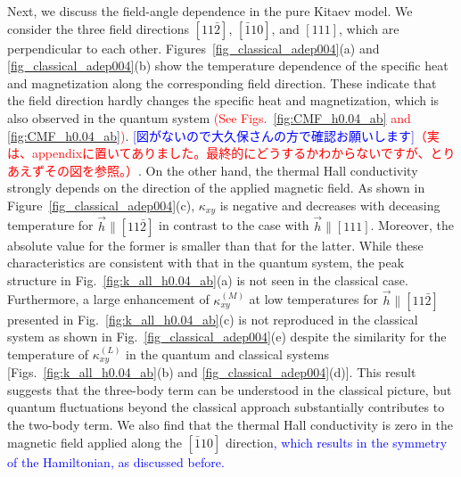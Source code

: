 \documentclass[reprint,amsmath,amssymb,aps,prx]{revtex4-2}
\newcommand{\red}[1]{\textcolor{red}{#1}}
\newcommand{\blue}[1]{\textcolor{blue}{#1}}
\begin{document}
Next, we discuss the field-angle dependence in the pure Kitaev model.
We consider the three field directions $[11\bar{2}]$, $[\bar{1}10]$, and $[111]$, which are perpendicular to each other.
Figures~\ref{fig_classical_adep004}(a) and \ref{fig_classical_adep004}(b) show the temperature dependence of the specific heat and magnetization along the corresponding field direction.
These indicate that the field direction hardly changes the specific heat and magnetization, which is also observed in the quantum system \red{(See Figs.~\ref{fig:CMF_h0.04_ab} and \ref{fig:CMF_h0.04_ab})}. \blue{[図がないので大久保さんの方で確認お願いします]}\red{（実は、appendixに置いてありました。最終的にどうするかわからないですが、とりあえずその図を参照。）}.
On the other hand, the thermal Hall conductivity strongly depends on the direction of the applied magnetic field.
As shown in Figure~\ref{fig_classical_adep004}(c), $\kappa_{xy}$ is negative and decreases with deceasing temperature for $\vec{h}\parallel [11\bar{2}]$ in contrast to the case with $\vec{h}\parallel [111]$.
Moreover, the absolute value for the former is smaller than that for the latter.
While these characteristics are consistent with that in the quantum system, the peak structure in Fig.~\ref{fig:k_all_h0.04_ab}(a) is not seen in the classical case.
Furthermore, a large enhancement of $\kappa_{xy}^{(M)}$ at low temperatures for $\vec{h}\parallel [11\bar{2}]$ presented in Fig.~\ref{fig:k_all_h0.04_ab}(c) is not reproduced in the classical system as shown in Fig.~\ref{fig_classical_adep004}(e) despite the similarity for the temperature of $\kappa_{xy}^{(L)}$ in the quantum and classical systems [Figs.~\ref{fig:k_all_h0.04_ab}(b) and \ref{fig_classical_adep004}(d)].
This result suggests that the three-body term can be understood in the classical picture, but quantum fluctuations beyond the classical approach substantially contributes to the two-body term.
We also find that the thermal Hall conductivity is zero in the magnetic field applied along the $[\bar{1}10]$ direction\blue{, which results in the symmetry of the Hamiltonian, as discussed before.}
\end{document}
